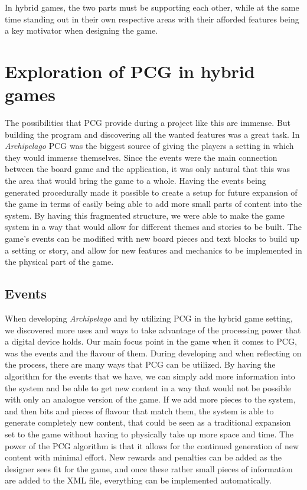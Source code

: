 In hybrid games, the two parts must be supporting each other, while at the same time standing out in their own respective areas with their afforded features being a key motivator when designing the game. 


\section{Exploration of PCG in hybrid games}
The possibilities that PCG provide during a project like this are immense. But building the program and discovering all the wanted features was a great task. In \textit{Archipelago} PCG was the biggest source of giving the players a setting in which they would immerse themselves. Since the events were the main connection between the board game and the application, it was only natural that this was the area that would bring the game to a whole. Having the events being generated procedurally made it possible to create a setup for future expansion of the game in terms of easily being able to add more small parts of content into the system. By having this fragmented structure, we were able to make the game system in a way that would allow for different themes and stories to be built. The game's events can be modified with new board pieces and text blocks to build up a setting or story, and allow for new features and mechanics to be implemented in the physical part of the game.

\subsection{Events}
When developing \textit{Archipelago} and by utilizing PCG in the hybrid game setting, we discovered more uses and ways to take advantage of the processing power that a digital device holds. Our main focus point in the game when it comes to PCG, was the events and the flavour of them. During developing and when reflecting on the process, there are many ways that PCG can be utilized. By having the algorithm for the events that we have, we can simply add more information into the system and be able to get new content in a way that would not be possible with only an analogue version of the game. If we add more pieces to the system, and then bits and pieces of flavour that match them, the system is able to generate completely new content, that could be seen as a traditional expansion set to the game without having to physically take up more space and time. The power of the PCG algorithm is that it allows for the continued generation of new content with minimal effort. New rewards and penalties can be added as the designer sees fit for the game, and once these rather small pieces of information are added to the XML file, everything can be implemented automatically.

